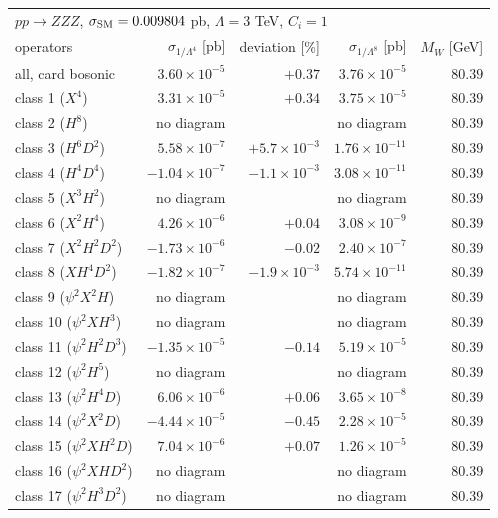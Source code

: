\begin{table}[t]\centering\footnotesize\setlength{\tabcolsep}{4pt}
\begin{tabular}{@{}lrrrr@{}}\hline
\multicolumn{5}{l}{$p p \to Z Z Z$, $\sigma_{\rm SM} = 0.009804$ pb, $\Lambda = 3$ TeV, $C_i = 1$}\\
operators & $\sigma_{1/\Lambda^4}$ [pb] & deviation [\%] & $\sigma_{1/\Lambda^8}$ [pb] & $M_W$ [GeV]\\\hline
all, card bosonic & $3.60\times 10^{-5}$ & $+0.37$ & $3.76\times 10^{-5}$ & $80.39$\\
class 1 ($X^4$) & $3.31\times 10^{-5}$ & $+0.34$ & $3.75\times 10^{-5}$ & $80.39$\\
class 2 ($H^8$) & no diagram &  & no diagram & $80.39$\\
class 3 ($H^6 D^2$) & $5.58\times 10^{-7}$ & $+5.7\times 10^{-3}$ & $1.76\times 10^{-11}$ & $80.39$\\
class 4 ($H^4 D^4$) & $-1.04\times 10^{-7}$ & $-1.1\times 10^{-3}$ & $3.08\times 10^{-11}$ & $80.39$\\
class 5 ($X^3 H^2$) & no diagram &  & no diagram & $80.39$\\
class 6 ($X^2 H^4$) & $4.26\times 10^{-6}$ & $+0.04$ & $3.08\times 10^{-9}$ & $80.39$\\
class 7 ($X^2 H^2 D^2$) & $-1.73\times 10^{-6}$ & $-0.02$ & $2.40\times 10^{-7}$ & $80.39$\\
class 8 ($X H^4 D^2$) & $-1.82\times 10^{-7}$ & $-1.9\times 10^{-3}$ & $5.74\times 10^{-11}$ & $80.39$\\
class 9 ($\psi^2 X^2 H$) & no diagram &  & no diagram & $80.39$\\
class 10 ($\psi^2 X H^3$) & no diagram &  & no diagram & $80.39$\\
class 11 ($\psi^2 H^2 D^3$) & $-1.35\times 10^{-5}$ & $-0.14$ & $5.19\times 10^{-5}$ & $80.39$\\
class 12 ($\psi^2 H^5$) & no diagram &  & no diagram & $80.39$\\
class 13 ($\psi^2 H^4 D$) & $6.06\times 10^{-6}$ & $+0.06$ & $3.65\times 10^{-8}$ & $80.39$\\
class 14 ($\psi^2 X^2 D$) & $-4.44\times 10^{-5}$ & $-0.45$ & $2.28\times 10^{-5}$ & $80.39$\\
class 15 ($\psi^2 X H^2 D$) & $7.04\times 10^{-6}$ & $+0.07$ & $1.26\times 10^{-5}$ & $80.39$\\
class 16 ($\psi^2 X H D^2$) & no diagram &  & no diagram & $80.39$\\
class 17 ($\psi^2 H^3 D^2$) & no diagram &  & no diagram & $80.39$\\

\end{tabular}
\end{table}
